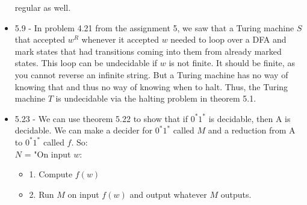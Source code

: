 \documentclass{article}
\begin{document}
\begin{itemize}
    regular as well.
  \item 5.9 - In problem 4.21 from the assignment 5, we saw that a Turing machine $S$ that accepted $w^{R}$ whenever it accepted $w$ needed to loop over a DFA and mark states that had transitions coming into them from already marked states. This loop can be undecidable if $w$ is not finite. It should be finite, as you cannot reverse an infinite string. But a Turing machine has no way of knowing that and thus no way of knowing when to halt. Thus, the Turing machine $T$ is undecidable via the
    halting problem in theorem 5.1.
  \item 5.23 - We can use theorem 5.22 to show that if $0^{*}1^{*}$ is decidable, then A is decidable. We can make a decider for $0^{*}1^{*}$ called $M$ and a reduction from A to $0^{*}1^{*}$ called $f$. So: \\
    $N$ = "On input $w$:
    \begin{itemize}
      \item 1. Compute $f(w)$
      \item 2. Run $M$ on input $f(w)$ and output whatever $M$ outputs.
    \end{itemize}
\end{itemize}
\end{document}

